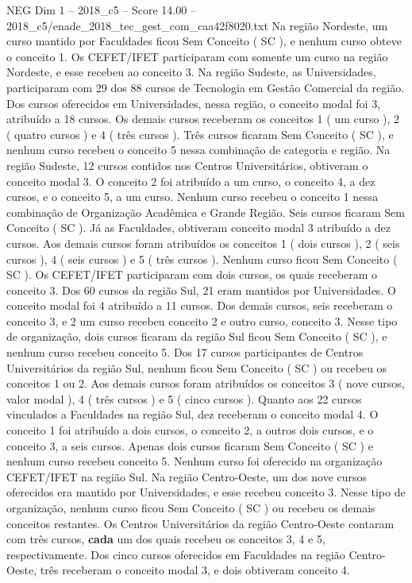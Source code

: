 \begin{textsample}{NEG Dim 1 – 2018\_c5 – Score 14.00 – 2018\_c5/enade\_2018\_tec\_gest\_com\_caa42f8020.txt}
Na região Nordeste, um curso mantido por Faculdades ficou Sem Conceito ( SC ), e nenhum curso obteve o conceito 1.
Os CEFET/IFET participaram com somente um curso na região Nordeste, e esse recebeu ao conceito 3.
Na região Sudeste, as Universidades, participaram com 29 dos 88 cursos de Tecnologia em Gestão Comercial da região.
Dos cursos oferecidos em Universidades, nessa região, o conceito modal foi 3, atribuído a 18 cursos.
Os demais cursos receberam os conceitos 1 ( um curso ), 2 ( quatro cursos ) e 4 ( três cursos ).
Três cursos ficaram Sem Conceito ( SC ), e nenhum curso recebeu o conceito 5 nessa combinação de categoria e região.
Na região Sudeste, 12 cursos contidos nos Centros Universitários, obtiveram o conceito modal 3.
O conceito 2 foi atribuído a um curso, o conceito 4, a dez cursos, e o conceito 5, a um curso.
Nenhum curso recebeu o conceito 1 nessa combinação de Organização Acadêmica e Grande Região.
Seis cursos ficaram Sem Conceito ( SC ).
Já as Faculdades, obtiveram conceito modal 3 atribuído a dez cursos.
Aos demais cursos foram atribuídos os conceitos 1 ( dois cursos ), 2 ( seis cursos ), 4 ( seis cursos ) e 5 ( três cursos ).
Nenhum curso ficou Sem Conceito ( SC ).
Os CEFET/IFET participaram com dois cursos, os quais receberam o conceito 3.
Dos 60 cursos da região Sul, 21 eram mantidos por Universidades.
O conceito modal foi 4 atribuído a 11 cursos.
Dos demais cursos, seis receberam o conceito 3, e 2 um curso recebeu conceito 2 e outro curso, conceito 3.
Nesse tipo de organização, dois cursos ficaram da região Sul ficou Sem Conceito ( SC ), e nenhum curso recebeu conceito 5.
Dos 17 cursos participantes de Centros Universitários da região Sul, nenhum ficou Sem Conceito ( SC ) ou recebeu os conceitos 1 ou 2.
Aos demais cursos foram atribuídos os conceitos 3 ( nove cursos, valor modal ), 4 ( três cursos ) e 5 ( cinco cursos ).
Quanto aos 22 cursos vinculados a Faculdades na região Sul, dez receberam o conceito modal 4.
O conceito 1 foi atribuído a dois cursos, o conceito 2, a outros dois cursos, e o conceito 3, a seis cursos.
Apenas dois cursos ficaram Sem Conceito ( SC ) e nenhum curso recebeu conceito 5.
Nenhum curso foi oferecido na organização CEFET/IFET na região Sul.
Na região Centro-Oeste, um dos nove cursos oferecidos era mantido por Universidades, e esse recebeu conceito 3.
Nesse tipo de organização, nenhum curso ficou Sem Conceito ( SC ) ou recebeu os demais conceitos restantes.
Os Centros Universitários da região Centro-Oeste contaram com três cursos, \textbf{cada} um dos quais recebeu os conceitos 3, 4 e 5, respectivamente.
Dos cinco cursos oferecidos em Faculdades na região Centro-Oeste, três receberam o conceito modal 3, e dois obtiveram conceito 4.

\end{textsample}
